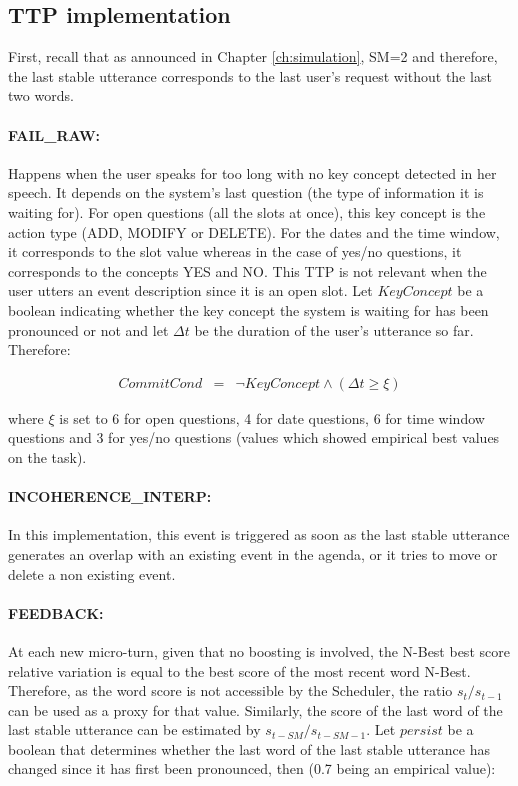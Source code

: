 	\subsection{TTP implementation}
    \label{subsec:ttpimpl}
    
    	First, recall that as announced in Chapter \ref{ch:simulation}, SM=2 and therefore, the last stable utterance corresponds to the last user's request without the last two words.
    
    	 \paragraph{FAIL\_RAW:} Happens when the user speaks for too long with no key concept detected in her speech. It depends on the system's last question (the type of information it is waiting for). For open questions (all the slots at once), this key concept is the action type (ADD, MODIFY or DELETE). For the dates and the time window, it corresponds to the slot value whereas in the case of yes/no questions, it corresponds to the concepts YES and NO. This TTP is not relevant when the user utters an event description since it is an open slot. Let $KeyConcept$ be a boolean indicating whether the key concept the system is waiting for has been pronounced or not and let $\Delta t$ be the duration of the user's utterance so far. Therefore:
			
			\begin{eqnarray}
				CommitCond & = & \neg KeyConcept \wedge (\Delta t \geq \xi) \nonumber
			\end{eqnarray}
			
			where $\xi$ is set to 6 for open questions, 4 for date questions, 6 for time window questions and 3 for yes/no questions (values which showed empirical best values on the task).
         
         \paragraph{INCOHERENCE\_INTERP:} In this implementation, this event is triggered as soon as the last stable utterance generates an overlap with an existing event in the agenda, or it tries to move or delete a non existing event.
         
         \paragraph{FEEDBACK:} At each new micro-turn, given that no boosting is involved, the N-Best best score relative variation is equal to the best score of the most recent word N-Best. Therefore, as the word score is not accessible by the Scheduler, the ratio $s_t/s_{t-1}$ can be used as a proxy for that value. Similarly, the score of the last word of the last stable utterance can be estimated by $s_{t-SM}/s_{t-SM-1}$. Let $persist$ be a boolean that determines whether the last word of the last stable utterance has changed since it has first been pronounced, then (0.7 being an empirical value):
				
